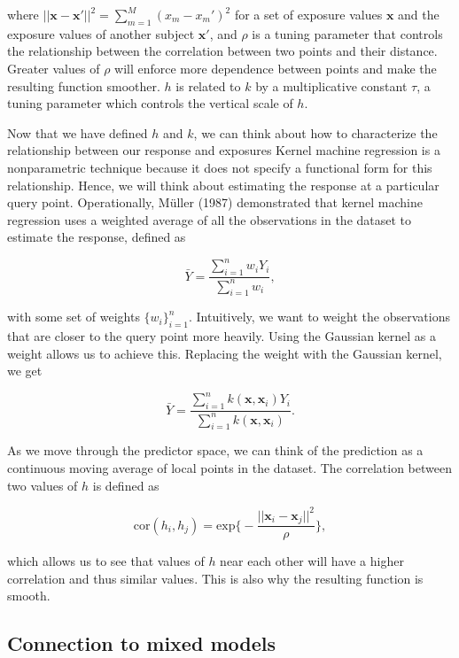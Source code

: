 \documentclass[12pt, twoside]{amherstthesis}
\begin{document}
\noindent where \(||\textbf{x}-\textbf{x}'||^2 = \sum_{m=1}^M{(x_{m}-x_{m}')^2}\) for a set of exposure values \(\textbf{x}\) and the exposure values of another subject \(\textbf{x}'\), and \(\rho\) is a tuning parameter that controls the relationship between the correlation between two points and their distance. Greater values of \(\rho\) will enforce more dependence between points and make the resulting function smoother. \(h\) is related to \(k\) by a multiplicative constant \(\tau\), a tuning parameter which controls the vertical scale of \(h\).

Now that we have defined \(h\) and \(k\), we can think about how to characterize the relationship between our response and exposures Kernel machine regression is a nonparametric technique because it does not specify a functional form for this relationship. Hence, we will think about estimating the response at a particular query point. Operationally, Müller (1987) demonstrated that kernel machine regression uses a weighted average of all the observations in the dataset to estimate the response, defined as

\[
\bar{Y} = \frac{\sum_{i=1}^nw_iY_i}{\sum_{i=1}^nw_i},
\]

\noindent with some set of weights \(\{w_i\}_{i=1}^n\). Intuitively, we want to weight the observations that are closer to the query point more heavily. Using the Gaussian kernel as a weight allows us to achieve this. Replacing the weight with the Gaussian kernel, we get

\[
\bar{Y} = \frac{\sum_{i=1}^n k(\textbf{x}, \textbf{x}_i) Y_i}
{\sum_{i=1}^n k(\textbf{x}, \textbf{x}_i)}.
\]

As we move through the predictor space, we can think of the prediction as a continuous moving average of local points in the dataset. The correlation between two values of \(h\) is defined as

\[
\textrm{cor}(h_i, h_j) = \textrm{exp} \bigg\{-\frac{||
\textbf{x}_{i}-\textbf{x}_{j}||^2}{\rho} \bigg\},
\]

\noindent which allows us to see that values of \(h\) near each other will have a higher correlation and thus similar values. This is also why the resulting function is smooth.

\hypertarget{connection-to-mixed-models}{%
\subsection{Connection to mixed models}\label{connection-to-mixed-models}}
\end{document}
